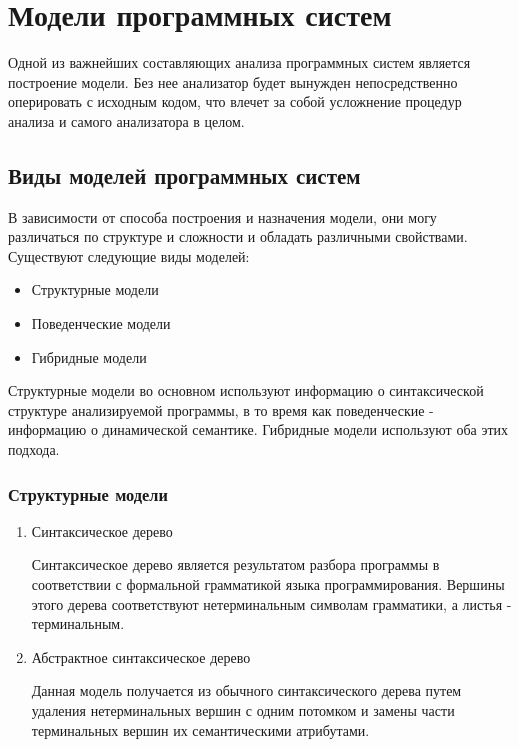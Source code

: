 \section{Модели программных систем} %
\label{sec:models}

Одной из важнейших составляющих анализа программных систем является построение
модели. Без нее анализатор будет вынужден непосредственно оперировать с исходным
кодом, что влечет за собой усложнение процедур анализа и самого анализатора в
целом.

\subsection{Виды моделей программных систем} %

В зависимости от способа построения и назначения модели, они могу различаться по
структуре и сложности и обладать различными свойствами. Существуют следующие
виды моделей:

\begin{itemize}
    \item Структурные модели
    \item Поведенческие модели
    \item Гибридные модели
\end{itemize}

Структурные модели во основном используют информацию о синтаксической структуре
анализируемой программы, в то время как поведенческие - информацию о
динамической семантике. Гибридные модели используют оба этих подхода.

\subsubsection{Структурные модели} %
\begin{enumerate}
    \item Синтаксическое дерево

    Синтаксическое дерево является результатом разбора программы в
    соответствии с формальной грамматикой языка программирования. Вершины
    этого дерева соответствуют нетерминальным символам грамматики, а листья
    - терминальным.

    \item Абстрактное синтаксическое дерево

    Данная модель получается из обычного синтаксического дерева путем
    удаления нетерминальных вершин с одним потомком и замены части
    терминальных вершин их семантическими атрибутами.
\end{enumerate}

